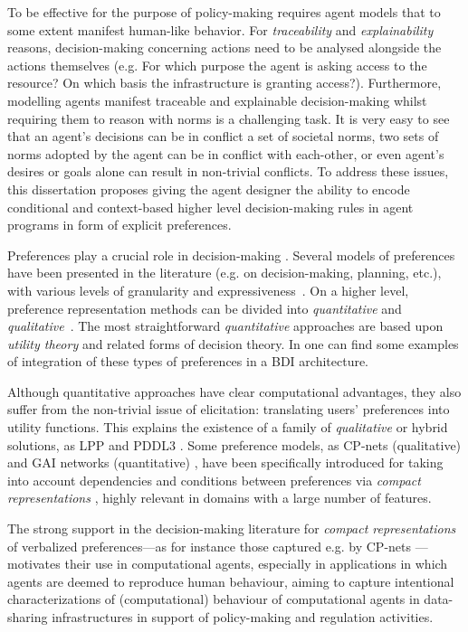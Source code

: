 To be effective for the purpose of policy-making requires agent models that to some extent manifest human-like behavior. For \textit{traceability} and \textit{explainability} reasons, decision-making concerning actions need to be analysed alongside the actions themselves (e.g. For which purpose the agent is asking access to the resource? On which basis the infrastructure is granting access?). Furthermore, modelling agents manifest traceable and explainable decision-making whilst requiring them to reason with norms is a challenging task. It is very easy to see that an agent's decisions can be in conflict a set of societal norms, two sets of norms adopted by the agent can be in conflict with each-other, or even agent's desires or goals alone can result in non-trivial conflicts. To address these issues, this dissertation proposes giving the agent designer the ability to encode conditional and context-based higher level decision-making rules in agent programs in form of explicit preferences.

Preferences play a crucial role in decision-making \cite{Pigozzi2016}. Several models of preferences have been presented in the literature (e.g. on decision-making, planning, etc.), with various levels of granularity and expressiveness~\cite{Baier2008,Brafman2009}. On a higher level, preference representation methods can be divided into \textit{quantitative} and \textit{qualitative}~\cite{Baier2008}. The most straightforward \textit{quantitative} approaches are based upon \textit{utility theory} and related forms of decision theory. In \cite{Cranefield2017} one can find some examples of integration of these types of preferences in a BDI architecture. 

Although quantitative approaches have clear computational advantages, they also suffer from the non-trivial issue of elicitation: translating users' preferences into utility functions. This explains the existence of a family of \textit{qualitative} or hybrid solutions, as LPP \cite{Bienvenu2006} and PDDL3 \cite{Gerevini2005}. Some preference models, as CP-nets (qualitative) \cite{Boutilier2004} and GAI networks (quantitative) \cite{Gonzales2004}, have been specifically introduced for taking into account dependencies and conditions between preferences via \textit{compact representations} \cite{Pigozzi2016}, highly relevant in domains with a large number of features.

The strong support in the decision-making literature for \textit{compact representations} of verbalized preferences---as for instance those captured e.g. by CP-nets \cite{Boutilier2004}---motivates their use in computational agents, especially in applications in which agents are deemed to reproduce human behaviour, aiming to capture intentional characterizations of (computational) behaviour of computational agents in data-sharing infrastructures in support of policy-making and regulation activities.  %

